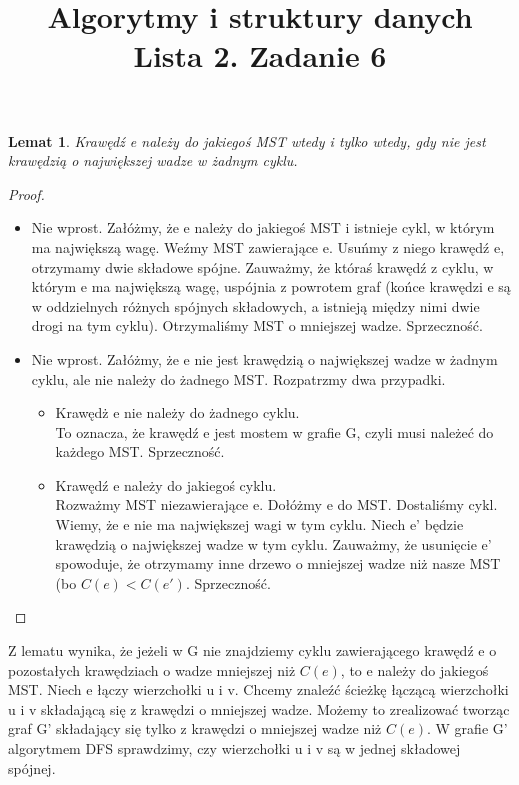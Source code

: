 \documentclass{article}
\title{Algorytmy i struktury danych \\ Lista 2. Zadanie 6}
\newtheorem{lemma}{Lemat}
\begin{document}
\maketitle
\begin{lemma}
Krawędź e należy do jakiegoś MST wtedy i tylko wtedy, gdy nie jest krawędzią o największej wadze w żadnym cyklu.
\end{lemma}
\begin{proof}
\begin{itemize}
    \item[$\Rightarrow$] Nie wprost. Załóżmy, że e należy do jakiegoś MST i istnieje cykl, w którym ma największą wagę. Weźmy MST zawierające e. Usuńmy z niego krawędź e, otrzymamy dwie składowe spójne. Zauważmy, że któraś krawędź z cyklu, w którym e ma największą wagę, uspójnia z powrotem graf (końce krawędzi e są w oddzielnych różnych spójnych składowych, a istnieją między nimi dwie drogi na tym cyklu). Otrzymaliśmy MST o mniejszej wadze. Sprzeczność.
    \item[$\Leftarrow$] Nie wprost. Załóżmy, że e nie jest krawędzią o największej wadze w żadnym cyklu, ale nie należy do żadnego MST. Rozpatrzmy dwa przypadki.
    \begin{itemize}
    \item[1\textdegree] Krawędż e nie należy do żadnego cyklu. \\
    To oznacza, że krawędź e jest mostem w grafie G, czyli musi należeć do każdego MST. Sprzeczność.
    \item[2\textdegree] Krawędź e należy do jakiegoś cyklu. \\ Rozważmy MST niezawierające e. Dołóżmy e do MST. Dostaliśmy cykl. Wiemy, że e nie ma największej wagi w tym cyklu. Niech e' będzie krawędzią o największej wadze w tym cyklu. Zauważmy, że usunięcie e' spowoduje, że otrzymamy inne drzewo o mniejszej wadze niż nasze MST (bo $C(e)<C(e')$. Sprzeczność.
\end{itemize}
\end{itemize}
\end{proof}
Z lematu wynika, że jeżeli w G nie znajdziemy cyklu zawierającego krawędź e o pozostałych krawędziach o wadze mniejszej niż $C(e)$, to e należy do jakiegoś MST. Niech e łączy wierzchołki u i v. Chcemy znaleźć ścieżkę łączącą wierzchołki u i v składającą się z krawędzi o mniejszej wadze. Możemy to zrealizować tworząc graf G' składający się tylko z krawędzi o mniejszej wadze niż $C(e)$. W grafie G' algorytmem DFS sprawdzimy, czy wierzchołki u i v są w jednej składowej spójnej.
\end{document}
